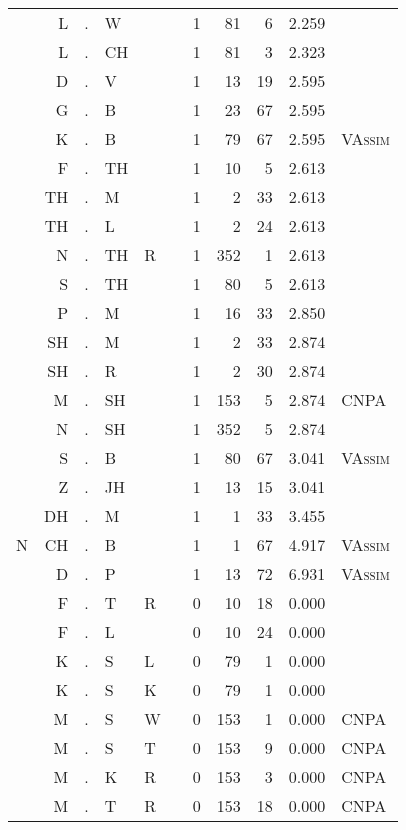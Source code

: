 \begin{longtable}{r@{ } r@{ } c@{ } l@{ } l@{ } l@{ } r r r r l }
  & L & . & W &   &   & 1 & 81 & 6 & 2.259 &  \\
  & L & . & CH &   &   & 1 & 81 & 3 & 2.323 &  \\
  & D & . & V &   &   & 1 & 13 & 19 & 2.595 &  \\
  & G & . & B &   &   & 1 & 23 & 67 & 2.595 &  \\
  & K & . & B &   &   & 1 & 79 & 67 & 2.595 & \textsc{VAssim} \\
  & F & . & TH &   &   & 1 & 10 & 5 & 2.613 &  \\
  & TH & . & M &   &   & 1 & 2 & 33 & 2.613 &  \\
  & TH & . & L &   &   & 1 & 2 & 24 & 2.613 &  \\
  & N & . & TH & R &   & 1 & 352 & 1 & 2.613 &  \\
  & S & . & TH &   &   & 1 & 80 & 5 & 2.613 &  \\
  & P & . & M &   &   & 1 & 16 & 33 & 2.850 &  \\
  & SH & . & M &   &   & 1 & 2 & 33 & 2.874 &  \\
  & SH & . & R &   &   & 1 & 2 & 30 & 2.874 &  \\
  & M & . & SH &   &   & 1 & 153 & 5 & 2.874 & \textsc{CNPA} \\
  & N & . & SH &   &   & 1 & 352 & 5 & 2.874 &  \\
  & S & . & B &   &   & 1 & 80 & 67 & 3.041 & \textsc{VAssim} \\
  & Z & . & JH &   &   & 1 & 13 & 15 & 3.041 &  \\
  & DH & . & M &   &   & 1 & 1 & 33 & 3.455 &  \\
N & CH & . & B &   &   & 1 & 1 & 67 & 4.917 & \textsc{VAssim} \\
  & D & . & P &   &   & 1 & 13 & 72 & 6.931 & \textsc{VAssim} \\
  & F & . & T & R &   & 0 & 10 & 18 & 0.000 &  \\
  & F & . & L &   &   & 0 & 10 & 24 & 0.000 &  \\
  & K & . & S & L &   & 0 & 79 & 1 & 0.000 &  \\
  & K & . & S & K &   & 0 & 79 & 1 & 0.000 &  \\
  & M & . & S & W &   & 0 & 153 & 1 & 0.000 & \textsc{CNPA} \\
  & M & . & S & T &   & 0 & 153 & 9 & 0.000 & \textsc{CNPA} \\
  & M & . & K & R &   & 0 & 153 & 3 & 0.000 & \textsc{CNPA} \\
  & M & . & T & R &   & 0 & 153 & 18 & 0.000 & \textsc{CNPA} \\

\end{longtable}
